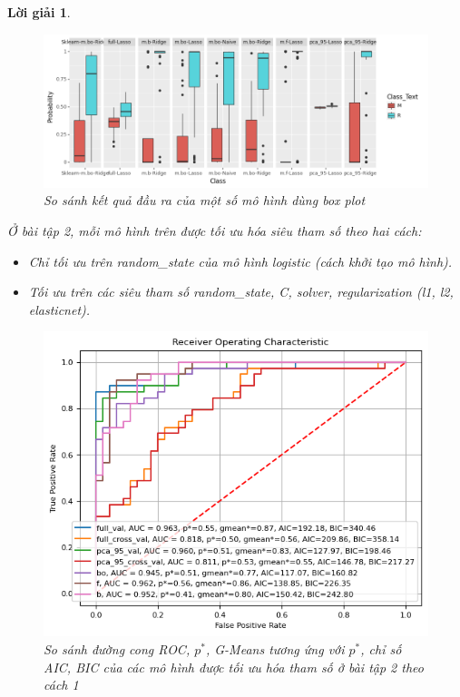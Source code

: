 \documentclass[14pt, a4paper]{article}
\theoremstyle{sltheorem}
\theoremstyle{soltheorem}
\newtheorem*{loigiai}{Lời giải}
\begin{document}
\begin{loigiai}
    \begin{figure}[h!]
        \centering
        \includegraphics[width=1.0\textwidth]{figures/prob_box_plot.png}
        \caption{So sánh kết quả đầu ra của một số mô hình dùng box plot}
        \label{fig:prob_box_plot}
    \end{figure}

    Ở bài tập 2, mỗi mô hình trên được tối ưu hóa siêu tham số theo hai cách:

    \begin{itemize}
        \item Chỉ tối ưu trên random\_state của mô hình logistic (cách khởi tạo mô hình).
        \item Tối ưu trên các siêu tham số random\_state, C, solver, regularization (l1, l2, elasticnet).
    \end{itemize}

    \begin{figure}[h!]
        \centering
        \includegraphics[width=1.0\textwidth]{figures/ROC_Curve_AIC_BIC_Excercise_2_1.png}
        \caption{ So sánh đường cong ROC, $p^*$, G-Means tương ứng với $p^*$, chỉ số AIC, BIC của các mô hình được tối ưu hóa tham số ở bài tập 2 theo cách 1}
        \label{fig:ROC_Curve_AIC_BIC_Excercise_2_1}
    \end{figure}


\end{loigiai}
\end{document}
